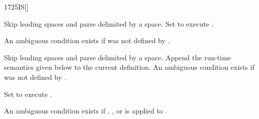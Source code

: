 \begin{worddef}{1725}{IS}[]%
\interpret

	Skip leading spaces and parse  delimited by a space.
	Set  to execute .

	An ambiguous condition exists if  was not defined
	by .

\compile

	Skip leading spaces and parse  delimited by a space.
	Append the run-time semantics given below to the current definition.
	An ambiguous condition exists if  was not defined by
	.

\runtime

	Set  to execute .

	An ambiguous condition exists if , \word{[COMPILE]},
	\word{[']} or  is applied to .


	\begin{implement} %
		\word{:}  \\
		\tab {}   \\
		\tab[2]  \word{[']}   \\
		\tab {} \\
		\tab[2]   \\
		\tab {} \word{;} 
	\end{implement}

	\begin{testing} %
		 \\

		 \\

		 \\
	\end{testing}
\end{worddef}


